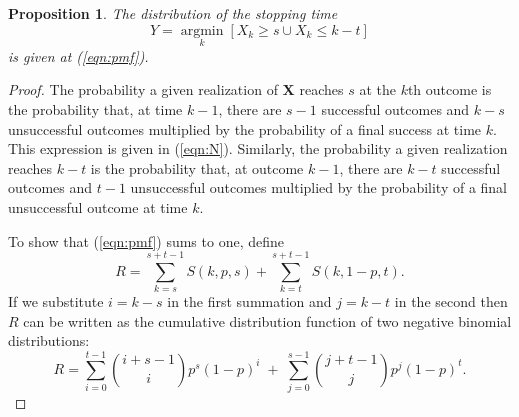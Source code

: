 \documentclass[review]{elsarticle}
\DeclareMathOperator*{\argmin}{argmin}
\newcommand*{\argminl}{\argmin\limits}
\newtheorem{prop}{Proposition}
\begin{document}
\begin{prop}
The distribution of the stopping time
\begin{equation*}
Y = \argminl_k \left[X_k \geq s \cup X_k \leq k-t \right]
\end{equation*}
is given at (\ref{eqn:pmf}).
\end{prop}
\begin{proof}

The probability a given realization of $\mathbf{X}$ reaches $s$ at
the $k$th outcome is the probability that, at time $k-1$, there are $s-1$
successful outcomes and $k-s$ unsuccessful outcomes multiplied by
the probability of a final success at time $k$. This expression is given
in (\ref{eqn:N}). 
Similarly, the probability a given realization reaches $k-t$
is the probability that, at outcome $k-1$, there are $k-t$ successful outcomes
and $t-1$ unsuccessful outcomes multiplied by the probability of a final
unsuccessful outcome at time $k$.  


To show that (\ref{eqn:pmf}) sums to one, define
\begin{equation*} 
R = \sum_{k=s}^{s+t-1} S(k, p, s) + \sum_{k=t}^{s+t-1} S(k, 1-p, t).
\end{equation*}
If we substitute $i=k-s$ in the first summation and $j=k-t$ in the second then
$R$ can be written as the cumulative distribution function of two
negative binomial distributions:
\begin{equation} \label{eqn:transformed_sum}
R = \sum_{i=0}^{t-1} {i+s-1 \choose i} p^s (1-p)^i \; + \;
\sum_{j=0}^{s-1} {j+t-1 \choose j} p^j (1-p)^t.
\end{equation}


\end{proof}
\end{document}
